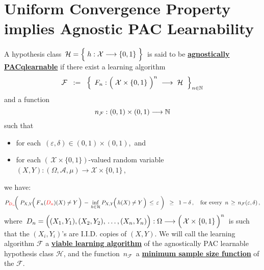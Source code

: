 

\section{Uniform Convergence Property implies Agnostic PAC Learnability}
\setcounter{theorem}{0}
\setcounter{equation}{0}


\renewcommand{\theenumi}{\roman{enumi}}
\renewcommand{\labelenumi}{\textnormal{(\theenumi)}$\;\;$}


\begin{definition}
\mbox{}\vskip 0.1cm
\noindent
A hypothesis class
\,$\mathcal{H} = \left\{\; h : \mathcal{X} \overset{{\color{white}-}}{\longrightarrow} \{0,1\} \;\right\}$\,
is said to be \underline{\textbf{agnostically PAC{\color{white}q}learnable}} if
there exist
a learning algorithm
\begin{equation*}
\mathcal{F}
\;\; : = \;\;
	\left\{\;\,
		F_{n} : \left(\;\mathcal{X} \overset{{\color{white}.}}{\times} \{0,1\} \;\right)^{n}
		\; \longrightarrow \;\mathcal{H}
		\;\;\right\}_{n\in\N}
\end{equation*}
and a function
\begin{equation*}
n_{\mathcal{F}} : (0,1) \times (0,1) \longrightarrow \mathbb{N}
\end{equation*}
such that
\begin{itemize}
\item
	for each \,$(\varepsilon,\delta) \in (0,1) \times (0,1)$,\, and
\item
	for each $\left(\,\mathcal{X}\times\{0,1\}\right)$-valued random variable
	$(X,Y) : (\Omega,\mathcal{A},\mu) \longrightarrow \mathcal{X}\times\{0,1\}$\,,
\end{itemize}
we have:
\begin{equation*}
P_{{\color{red}D_{n}}}\!\!\left(\;
	P_{X,Y}\!\!\left(\,\overset{{\color{white}.}}{F}_{n}({\color{red}D_{n}})(X) \neq Y \,\right)
		\,-\,
		\underset{h\in\mathcal{H}}{\inf}\,P_{X,Y}\!\!\left(\,\overset{{\color{white}.}}{h}(X) \neq Y \,\right)
	\,\leq\,
		\varepsilon
	\;\right)
\;\; \geq \;\;
	1 - \delta\,,
\quad
	\textnormal{for every \,$n \,\geq\, n_{\mathcal{F}}(\varepsilon,\delta)$}\,,
\end{equation*}
where
\,$D_{n} = \left((X_{1},Y_{1}),(X_{2},Y_{2}),\,\overset{{\color{white}\vert}}{\ldots}\,,(X_{n},Y_{n})\right)
	: \Omega \longrightarrow
	\left(\,\mathcal{X}\overset{{\color{white}.}}{\times}\{0,1\}\,\right)^{n}$\,
is such that the
$(X_{i},Y_{i})$'s are I.I.D. copies of $(X,Y)$.
We will call the learning algorithm $\mathcal{F}$ a \underline{\textbf{viable learning algorithm}}
of the agnostically PAC learnable hypothesis class $\mathcal{H}$, and the function
\,$n_{\mathcal{F}}$\, a \underline{\textbf{minimum sample size function}} of the $\mathcal{F}$.
\end{definition}


